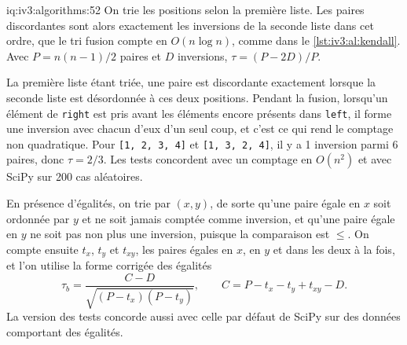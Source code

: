 \begin{solution}{iq:iv3:algorithms:52}
On trie les positions selon la première liste. Les paires discordantes sont alors exactement les inversions de la seconde liste dans cet ordre, que le tri fusion compte en $O(n \log n)$, comme dans le \cref{lst:iv3:al:kendall}. Avec $P = n(n-1)/2$ paires et $D$ inversions, $\tau = (P - 2D)/P$.
\label{lst:iv3:al:kendall}

La première liste étant triée, une paire est discordante exactement lorsque la seconde liste est désordonnée à ces deux positions. Pendant la fusion, lorsqu'un élément de \texttt{right} est pris avant les éléments encore présents dans \texttt{left}, il forme une inversion avec chacun d'eux d'un seul coup, et c'est ce qui rend le comptage non quadratique. Pour \texttt{[1, 2, 3, 4]} et \texttt{[1, 3, 2, 4]}, il y a 1 inversion parmi 6 paires, donc $\tau = 2/3$. Les tests concordent avec un comptage en $O(n^2)$ et avec SciPy sur 200 cas aléatoires.

En présence d'égalités, on trie par $(x, y)$, de sorte qu'une paire égale en $x$ soit ordonnée par $y$ et ne soit jamais comptée comme inversion, et qu'une paire égale en $y$ ne soit pas non plus une inversion, puisque la comparaison est $\le$. On compte ensuite $t_x$, $t_y$ et $t_{xy}$, les paires égales en $x$, en $y$ et dans les deux à la fois, et l'on utilise la forme corrigée des égalités
\[
\tau_b = \frac{C - D}{\sqrt{(P - t_x)(P - t_y)}}, \qquad C = P - t_x - t_y + t_{xy} - D.
\]
La version des tests concorde aussi avec celle par défaut de SciPy sur des données comportant des égalités.

\end{solution}

